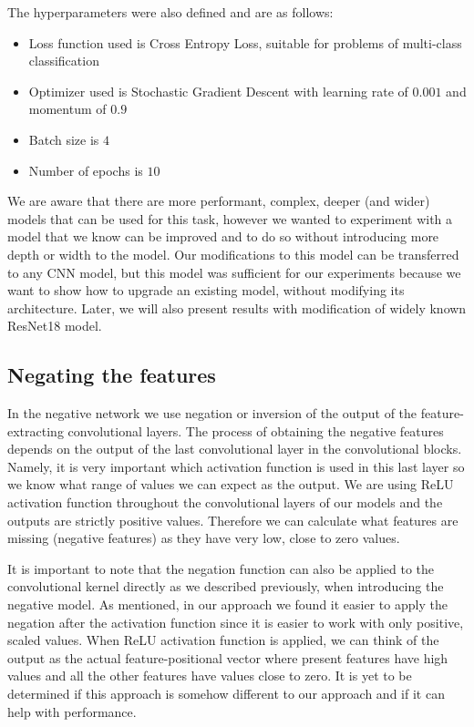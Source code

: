 \documentclass[b5paper]{book}
\let\cite\parencite
\begin{document}
The hyperparameters were also defined and are as follows:

\begin{itemize}
    \item Loss function used is Cross Entropy Loss, suitable for problems of multi-class classification
    \item Optimizer used is Stochastic Gradient Descent with learning rate of \(0.001\) and momentum of \(0.9\)
    \item Batch size is \(4\)
    \item Number of epochs is \(10\)
\end{itemize}

We are aware that there are more performant, complex, deeper (and wider) models that can be used for this task, however we wanted to experiment with a model that we know can be improved and to do so without introducing more depth or width to the model. Our modifications to this model can be transferred to any CNN model, but this model was sufficient for our experiments because we want to show how to upgrade an existing model, without modifying its architecture. Later, we will also present results with modification of widely known ResNet18 \cite{he2016deep} model.

\subsection{Negating the features}
\label{negation}

In the negative network we use negation or inversion of the output of the feature-extracting convolutional layers. The process of obtaining the negative features depends on the output of the last convolutional layer in the convolutional blocks. Namely, it is very important which activation function is used in this last layer so we know what range of values we can expect as the output. We are using ReLU activation function throughout the convolutional layers of our models and the outputs are strictly positive values. Therefore we can calculate what features are missing (negative features) as they have very low, close to zero values. 

It is important to note that the negation function can also be applied to the convolutional kernel directly as we described previously, when introducing the negative model. As mentioned, in our approach we found it easier to apply the negation after the activation function since it is easier to work with only positive, scaled values. When ReLU activation function is applied, we can think of the output as the actual feature-positional vector where present features have high values and all the other features have values close to zero. It is yet to be determined if this approach is somehow different to our approach and if it can help with performance.
\end{document}
